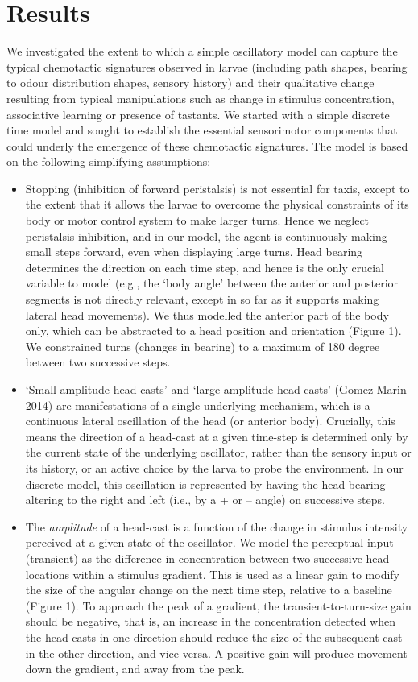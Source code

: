 \documentclass[10pt,a4paper]{article}
\begin{document}
\section{Results}
We investigated the extent to which a simple oscillatory model can capture the typical chemotactic signatures observed in larvae (including path shapes, bearing to odour distribution shapes, sensory history) and their qualitative change resulting from typical manipulations such as change in stimulus concentration, associative learning or presence of tastants. We started with a simple discrete time model and sought to establish the essential sensorimotor components that could underly the emergence of these chemotactic signatures. The model is based on the following simplifying assumptions:
\begin{itemize}
\item Stopping (inhibition of forward peristalsis) is not essential for taxis, except to the extent that it allows the larvae to overcome the physical constraints of its body or motor control system to make larger turns. Hence we neglect peristalsis inhibition, and in our model, the agent is continuously making small steps forward, even when displaying large turns.
Head bearing determines the direction on each time step, and hence is the only crucial variable to model (e.g., the ‘body angle’ between the anterior and posterior segments is not directly relevant, except in so far as it supports making lateral head movements). We thus modelled the anterior part of the body only, which can be abstracted to a head position and orientation (Figure 1). We constrained turns (changes in bearing) to a maximum of 180 degree between two successive steps.
\item ‘Small amplitude head-casts’ and ‘large amplitude head-casts’ (Gomez Marin 2014) are manifestations of a single underlying mechanism, which is a continuous lateral oscillation of the head (or anterior body). Crucially, this means the direction of a head-cast at a given time-step is determined only by the current state of the underlying oscillator, rather than the sensory input or its history, or an active choice by the larva to probe the environment. In our discrete model, this oscillation is represented by having the head bearing altering to the right and left (i.e., by a + or – angle) on successive steps. 
\item The {\it amplitude} of a head-cast is a function of the change in stimulus intensity perceived at a given state of the oscillator. We model the perceptual input (transient) as the difference in concentration between two successive head locations within a stimulus gradient. This is used as a linear gain to modify the size of the angular change on the next time step, relative to a baseline (Figure 1). 
To approach the peak of a gradient, the transient-to-turn-size gain should be negative, that is, an increase in the concentration detected when the head casts in one direction should reduce the size of the subsequent cast in the other direction, and vice versa. A positive gain will produce movement down the gradient, and away from the peak.
\end{itemize}
\end{document}
